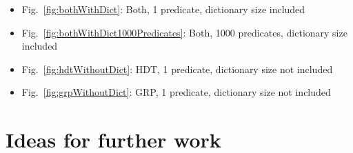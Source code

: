 \documentclass[a4paper]{scrartcl}
\begin{document}
\begin{itemize}
  \item Fig.~\ref{fig:bothWithDict}: Both, 1 predicate, dictionary size included
  \item Fig.~\ref{fig:bothWithDict1000Predicates}: Both, 1000 predicates, dictionary size included
  \item Fig.~\ref{fig:hdtWithoutDict}: HDT, 1 predicate, dictionary size not included
  \item Fig.~\ref{fig:grpWithoutDict}: GRP, 1 predicate, dictionary size not included
\end{itemize}

%
%
%
%

\section{Ideas for further work}
\end{document}
